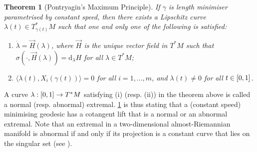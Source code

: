 \documentclass[11pt,twoside,a4paper]{article}
\newcommand{\red}{\color{red}}
\theoremstyle{theorem}
\newtheorem{theorem}{Theorem}[section]
\theoremstyle{definition}
\theoremstyle{remark}
\theoremstyle{proof}
\begin{document}
\begin{theorem}[Pontryagin's Maximum Principle]
\label{theorem:PMP}
     If $\gamma$ is length minimiser parametrised by constant speed, then there exists a Lipschitz curve $\lambda(t) \in T^*_{\gamma(t)}M$ such that one and only one of the following is satisfied:
\begin{enumerate}[label=\normalfont(\roman*)]
\item $\dot{\lambda} = \overrightarrow{H}(\lambda)$, where $\overrightarrow{H}$ is the unique vector field in $T^*M$ such that $\sigma(\cdot, \overrightarrow{H}(\lambda)) = \mathrm{d}_\lambda H$ for all $\lambda \in T^*M$;
\item $\langle \lambda(t), X_i(\gamma(t)) \rangle = 0$ for all $i = 1, \dots, m$, and $\lambda(t) \neq 0$ for all $t \in \interval{0}{1}$.
\end{enumerate}
\end{theorem}
A curve $\lambda : \interval{0}{1} \to T^*M$ satisfying (i) (resp. (ii)) in the theorem above is called a normal (resp. abnormal) extremal. \cref{theorem:PMP} is thus stating that a (constant speed) minimising geodesic has a cotangent lift that is a normal or an abnormal extremal. Note that an extremal in a two-dimensional almost-Riemannian manifold is abnormal if and only if its projection is a constant curve that lies on the singular set (see \cite[
Theorem 9.2]{ABB-srgeom}).


\end{document}
